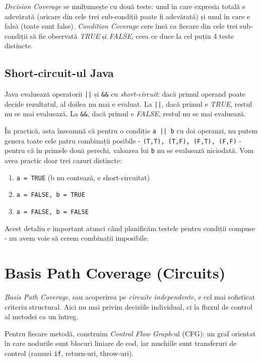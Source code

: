 \textit{Decision Coverage} se mulțumește cu două teste: unul în care expresia totală e adevărată (oricare din cele trei sub-condiții poate fi adevărată) și unul în care e falsă (toate sunt false). \textit{Condition Coverage} cere însă ca fiecare din cele trei sub-condiții să fie observată \textit{TRUE} și \textit{FALSE}, ceea ce duce la cel puțin 4 teste distincte.

\subsection{Short-circuit-ul Java}

Java evaluează operatorii \texttt{||} și \texttt{\&\&} cu \textit{short-circuit}: dacă primul operand poate decide rezultatul, al doilea nu mai e evaluat. La \texttt{||}, dacă primul e \textit{TRUE}, restul nu se mai evaluează. La \texttt{\&\&}, dacă primul e \textit{FALSE}, restul nu se mai evaluează.

În practică, asta înseamnă că pentru o condiție \texttt{a || b} cu doi operanzi, nu putem genera toate cele patru combinații posibile - \texttt{(T,T), (T,F), (F,T), (F,F)} - pentru că în primele două perechi, valoarea lui \texttt{b} nu se evaluează niciodată. Vom avea practic doar trei cazuri distincte:

\begin{enumerate}
    \item \texttt{a = TRUE} (b nu contează, e short-circuitat)
    \item \texttt{a = FALSE, b = TRUE}
    \item \texttt{a = FALSE, b = FALSE}
\end{enumerate}

Acest detaliu e important atunci când planificăm testele pentru condiții compuse - nu avem voie să cerem combinații imposibile.

\section{Basis Path Coverage (Circuits)}

\textit{Basis Path Coverage}, sau acoperirea pe \textit{circuite independente}, e cel mai sofisticat criteriu structural. Aici nu mai privim deciziile individual, ci la fluxul de control al metodei ca un întreg.

Pentru fiecare metodă, construim \textit{Control Flow Graph}-ul (CFG): un graf orientat în care nodurile sunt blocuri liniare de cod, iar muchiile sunt transferuri de control (ramuri \texttt{if}, return-uri, throw-uri).

